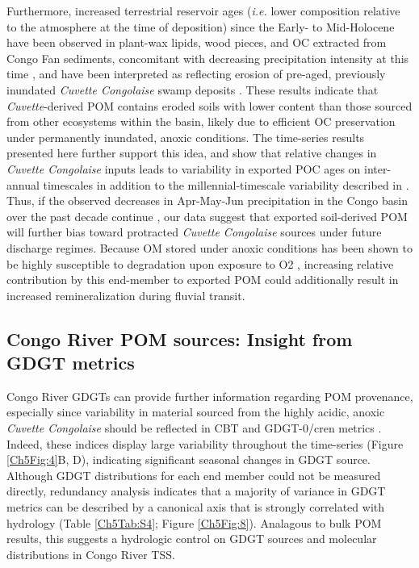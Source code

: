 Furthermore, increased terrestrial reservoir ages (\textit{i.e.} lower  composition relative to the atmosphere at the time of deposition) since the Early- to Mid-Holocene have been observed in plant-wax lipids, wood pieces, and OC extracted from Congo Fan sediments, concomitant with decreasing precipitation intensity at this time \citep{Schefuss:2005jo}, and have been interpreted as reflecting erosion of pre-aged, previously inundated \textit{Cuvette Congolaise} swamp deposits \citep{Schefuss:2016cp}. These results indicate that \textit{Cuvette}-derived POM contains eroded soils with lower  content than those sourced from other ecosystems within the basin, likely due to efficient OC preservation under permanently inundated, anoxic conditions. The time-series  results presented here further support this idea, and show that relative changes in \textit{Cuvette Congolaise} inputs leads to variability in exported POC ages on inter-annual timescales in addition to the millennial-timescale variability described in \citet{Schefuss:2016cp}. Thus, if the observed decreases in Apr-May-Jun precipitation in the Congo basin over the past decade continue \citep{Zhou:2014gl}, our data suggest that exported soil-derived POM will further bias toward protracted \textit{Cuvette Congolaise} sources under future discharge regimes. Because OM stored under anoxic conditions has been shown to be highly susceptible to degradation upon exposure to O2 \citep{Hoefs:2002wu}, increasing relative contribution by this end-member to exported POM could additionally result in increased remineralization during fluvial transit.

\subsection{Congo River POM sources: Insight from GDGT metrics}

Congo River GDGTs can provide further information regarding POM provenance, especially since variability in material sourced from the highly acidic, anoxic \textit{Cuvette Congolaise} \citep{Mann:2014jx} should be reflected in CBT and GDGT-0/cren metrics \citep{Blaga:2009ge,Peterse:2012bs}. Indeed, these indices display large variability throughout the time-series (Figure \ref{Ch5Fig:4}B, D), indicating significant seasonal changes in GDGT source. Although GDGT distributions for each end member could not be measured directly, redundancy analysis \citep[RDA;][]{Legendre:1998tt} indicates that a majority of variance in GDGT metrics can be described by a canonical axis that is strongly correlated with hydrology (Table \ref{Ch5Tab:S4}; Figure \ref{Ch5Fig:8}). Analagous to bulk POM results, this suggests a hydrologic control on GDGT sources and molecular distributions in Congo River TSS. 

